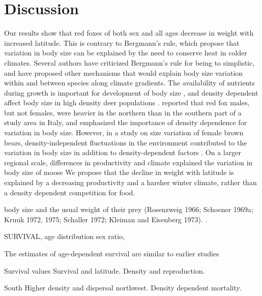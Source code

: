 \documentclass[PCJ,Unicode,screen]{cedram}
\begin{document}
\section*{Discussion}

Our results show that red foxes of both sex and all ages decrease in weight with increased latitude. This is contrary to Bergmann's rule, which propose that variation in body size can be explained by the need to conserve heat in colder climates. Several authors have criticized Bergmann's rule for being to simplistic, and have proposed other mechanisms that would explain body size variation within and between species along climate gradients\citep{mcnabEcologicalSignificanceBergmanns1971,blackburnGeographicGradientsBody1999a,frafjord1998red}. The availability of nutrients during growth is important for development of body size \citep{geistBergmannsRuleInvalid1987}, and density dependent affect body size in high density deer populations \citep{albonEarlyDevelopmentPopulation1987,festa-bianchetEarlyDevelopmentAdult2000,gaillardCohortEffectsDeer2003}. \citet{cavalliniVariationBodySize1995} reported that red fox males, but not females, were heavier in the northern than in the southern part of a study area in Italy, and emphasized the importance of density dependence for variation in body size. However, in a study on size variation of female brown bears, density-independent fluctuations in the environment contributed to the variation in body size in addition to density-dependent factors \citep{zedrosserPOPULATIONDENSITYFOOD2006}. On a larger regional scale, differences in productivity and climate explained the variation in body size of moose \citep{hjeljordRangebodyMassInteractions1999} We propose that the decline in weight with latitude is explained by a decreasing productivity and a harsher winter climate, rather than a density dependent competition for food.

body size and the usual weight of their prey (Rosenzweig 1966; Schoener 1969a; Kruuk 1972,
1975; Schaller 1972; Kleiman and Eisenberg 1973). \citep{gittlemanCarnivoreBodySize1985}. 



SURVIVAL, age distribution sex ratio, 

The estimates of age-dependent survival are similar to earlier studies 

Survival values
Survival and latitude. Density and reproduction. 

South  Higher density and dispersal northwest. Density dependent mortality. 
\end{document}
